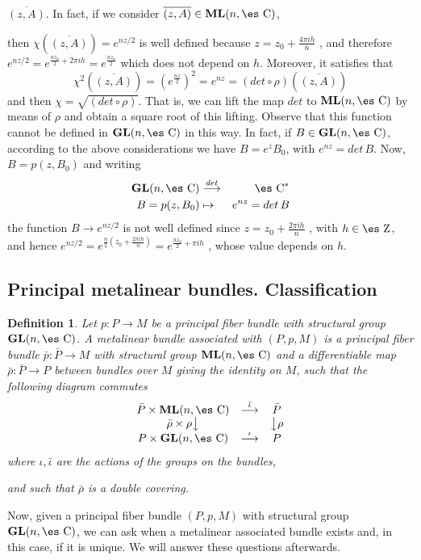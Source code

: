 \documentclass[12pt]{article}
\newtheorem{definition}{Definition}
\def\beann{\begin{eqnarray*}}
\def\eeann{\end{eqnarray*}}
\def\dst{\(}
\def\mapping#1{\mathrel{\mathop{\longrightarrow}\limits^{#1}}}
\def\GL{{\bf GL}(n,\Complex )}
\def\ML{{\bf ML}(n,\Complex )}
\def\Zahl{\mbox{\es Z}}
\def\Complex{\mbox{\es C}}
\begin{document}
$\overline{(z,A)}$.  In fact, if we consider $\overline{(z,A)} \in \ML$,

then $\chi(\overline{(z,A)}) = e^{nz/2}$ is well defined because
\dst z=z_0+\frac{4\pi i h}{n}\) , and therefore
\dst e^{nz/2}=e^{\frac{nz_0}{2}+2\pi i h}=e^{\frac{nz_0}{2}}\)
which does not depend on $h$. Moreover, it satisfies that
$$
\chi^2(\overline{(z,A)}) = (e^{\frac{nz}{2}})^2 = e^{nz} = (det \circ
\rho )(\overline{(z,A)})
$$
and then $\chi = \sqrt{(det \circ \rho )}$.
That is, we can lift the map $det$ to $\ML$ by means of $\rho$ and
obtain a square root of this lifting. Observe that this function cannot
be defined
in $\GL$ in this way. In fact, if $B \in \GL$, according to the above
considerations we have
$B=e^{z} B_0$, with $e^{nz}=det\, B$. Now, $B=p(z,B_0)$ and writing
\beann
\GL &\mapping{det}& \Complex^*
\\
B=p(z,B_0) &\mapsto& e^{nz}=det\, B
\eeann
the function $B \to e^{nz/2}$ is not well defined since
\dst z=z_0+\frac{2\pi i h}{n}\) , with $h\in \Zahl$, and hence
\dst e^{nz/2} =e^{\frac{n}{2}(z_0+\frac{2\pi i h}{n})} =
e^{\frac{nz_0}{2}+\pi i h}\) ,
whose value depends on $h$.



\subsection{Principal metalinear bundles. Classification}


\begin{definition}
Let $p : P \to M$ be a principal fiber bundle with structural group
$\GL$.
A {\rm metalinear bundle associated with} $(P,p,M)$
is a principal fiber bundle $\bar p : \bar P \to M$
 with structural group $\ML$ and a differentiable map
 $\bar \rho : \bar P\to P$
between bundles over $M$ giving the identity on $M$,
such that the following diagram commutes
$$
\begin{array}{ccc}
\bar P \times \ML & \mapping{\bar \iota} & \bar P
\\
\bar \rho \times \rho \big\downarrow & & \big\downarrow \rho
\\
P \times \GL & \mapping{\iota} & P
\end{array}
$$
where $\iota , \bar \iota$ are the actions of the groups on the bundles,

and such that $\bar \rho$ is a double covering.
\label{amfb}
\end{definition}

Now, given a principal fiber bundle $(P,p,M)$ with structural group
$\GL$,
we can ask when a metalinear associated bundle exists and,
in this case, if it is unique. We will answer these questions
afterwards.
\end{document}
